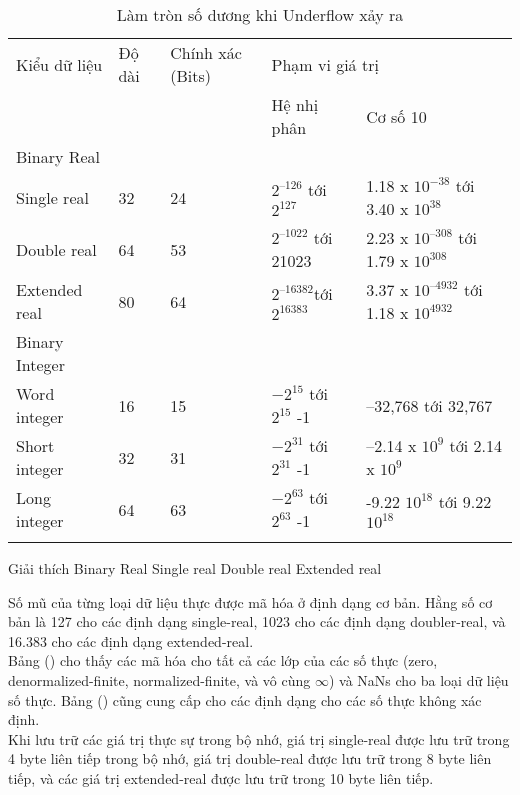 		\newpage
		\begin{longtable}{|l|l|p{2cm}|l|l|}
		 \hline
		 	Kiểu dữ liệu & Độ dài & Chính xác (Bits) & \multicolumn{2}{l|}{Phạm vi giá trị}\\
		 	\cline{4-5}
		 	& & &  Hệ nhị phân & Cơ số 10 \\		
		\hline	
			Binary Real & & & & \\
			Single real &32 &24 & $2^{–126}$ tới $2^{127}$ & 1.18 x $10^{-38}$ tới 3.40 x $10^{38}$\\
			Double real &64 & 53 & $2^{–1022}$ tới 21023 & 2.23 x $10^{–308}  $ tới 1.79 x $10^{308} $\\
			Extended real	&	80 &64&$2^{–16382}  $tới$ 2^{16383} $  & 3.37 x $ 10^{–4932} $ tới 1.18 x $10^{4932}  $\\
		 \hline
		 Binary Integer & & & &\\
			Word integer &16 &15 & $-2 ^{15} $ tới  $ 2^{15} $ -1  &  –32,768   tới 32,767 \\
			Short integer &32 &31 &$ -2^{31} $ tới  $ 2^{31} $  -1 & –2.14 x $10 ^{9 } $ tới 2.14 x $10 ^{9} $\\
			Long integer &64 &63  &$ -2^{63} $ tới  $ 2^{63} $ -1  & -9.22 $ 10^{18} $ tới 9.22  $10 ^{18} $\\
		 \hline					
		 		\caption{Làm tròn số dương khi Underflow xảy ra}
				 \label{tb:DLFPU}
		\end{longtable}
		
		Giải thích 
		Binary Real
		Single real
		Double real 
		Extended real		
		
	Số mũ của từng loại dữ liệu thực được mã hóa ở định dạng cơ bản. Hằng số cơ bản là 127 cho các định dạng single-real, 1023 cho các định dạng doubler-real, và 16.383 cho các định dạng extended-real.\\
	
	Bảng () cho thấy các mã hóa cho tất cả các lớp của các số thực (zero, denormalized-finite, normalized-finite, và vô cùng $\mathbb{\infty}$) và NaNs cho ba loại dữ liệu số thực. Bảng () cũng cung cấp cho các định dạng cho các số thực không xác định.\\

	Khi lưu trữ các giá trị thực sự trong bộ nhớ, giá trị single-real được lưu trữ trong 4 byte liên tiếp trong bộ nhớ, giá trị double-real được lưu trữ trong 8 byte liên tiếp, và các giá trị extended-real được lưu trữ trong 10 byte liên tiếp.\\

